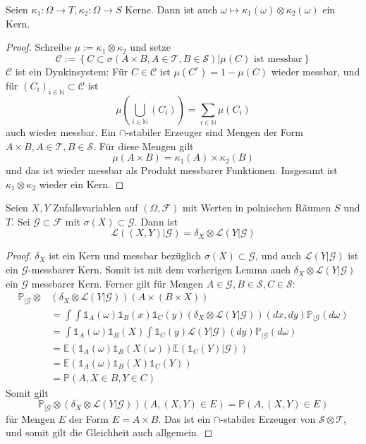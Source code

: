 \begin{lemma}\label{thm:kernel_prod}
Seien $\kappa_1: \Omega\rightarrow T,\kappa_2: \Omega\rightarrow S$ Kerne. Dann ist auch $\omega \mapsto \kappa_1(\omega) \otimes \kappa_2(\omega)$ ein Kern.
\end{lemma}
\begin{proof}
Schreibe $\mu:=\kappa_1\otimes\kappa_2$ und setze 
$$\mathcal{C}:=\left\{C\subset\sigma(A\times B, A\in\mathcal{T}, B\in\mathcal{S})\vert \mu(C) \text{ ist messbar}\right\}$$
$\mathcal{C}$ ist ein Dynkinsystem: Für $C\in\mathcal{C}$ ist $\mu(C^c)=1-\mu(C)$ wieder messbar, und für $(C_i)_{i\in\mathbb{N}}\subset \mathcal{C}$ ist 
$$\mu(\bigcup_{i\in\mathbb{N}}(C_i))=\sum_{i\in\mathbb{N}}\mu(C_i)$$
auch wieder messbar. Ein $\cap$-stabiler Erzeuger sind Mengen der Form $A\times B, A\in \mathcal{T}, B\in\mathcal{S}$. Für diese Mengen gilt
$$\mu(A\times B) = \kappa_1(A)\times\kappa_2(B)$$
und das ist wieder messbar als Produkt messbarer Funktionen. Insgesamt ist $\kappa_1\otimes\kappa_2$ wieder ein Kern.
\end{proof}
\begin{lemma}\label{thm:determined_kernel}
Seien $X, Y$ Zufallsvariablen auf $(\Omega, \mathcal{F})$ mit Werten in polnischen Räumen $S$ und $T$. Sei $\mathcal{G}\subset \mathcal{F}$ mit $\sigma(X)\subset \mathcal{G}$. Dann ist 
$$\mathcal{L}\left((X,Y)\vert \mathcal{G}\right) = \delta_X \otimes \mathcal{L}(Y\vert \mathcal{G})$$
\end{lemma}
\begin{proof}
    $\delta_X$ ist ein Kern und messbar bezüglich $\sigma(X)\subset \mathcal{G}$, und auch $\mathcal{L}(Y\vert \mathcal{G})$ ist ein $\mathcal{G}$-messbarer Kern. Somit ist mit dem vorherigen Lemma auch $\delta_X \otimes \mathcal{L}(Y\vert\mathcal{G})$ ein $\mathcal{G}$ messbarer Kern. Ferner gilt für Mengen $A\in \mathcal{G}, B\in\mathcal{S}, C \in \mathcal{S}$:
    \begin{align*}
        \mathbb{P}_{\vert\mathcal{G}} \otimes &\left(\delta_X\otimes \mathcal{L}(Y\vert \mathcal{G})\right)(A\times(B\times X)) \\
        &= \int \int \mathds{1}_A(\omega)\mathds{1}_B(x)\mathds{1}_C(y) (\delta_X\otimes \mathcal{L}(Y\vert\mathcal{G}))(dx, dy)\mathbb{P}_{\vert\mathcal{G}}(d\omega) \\
        &= \int \mathds{1}_A(\omega) \mathds{1}_B(X)\int\mathds{1}_C(y)\mathcal{L}(Y\vert\mathcal{G})(dy)\mathbb{P}_{\vert\mathcal{G}}(d\omega) \\
        &= \mathbb{E}\left(\mathds{1}_A(\omega)\mathds{1}_B(X(\omega))\mathbb{E}(\mathds{1}_C(Y)\vert \mathcal{G})\right) \\
        &= \mathbb{E}(\mathds{1}_A(\omega)\mathds{1}_B(X)\mathds{1}_C(Y)) \\
        &= \mathbb{P}(A, X\in B, Y\in C)
    \end{align*}
    Somit gilt 
    $$\mathbb{P}_{\vert\mathcal{G}} \otimes \left(\delta_X\otimes \mathcal{L}(Y\vert \mathcal{G})\right)(A, (X, Y) \in E) = \mathbb{P}(A, (X, Y)\in E)$$
    für Mengen $E$ der Form $E=A\times B$. Das ist ein $\cap$-stabiler Erzeuger von $\mathcal{S}\otimes\mathcal{T}$, und somit gilt die Gleichheit auch allgemein.
\end{proof}
